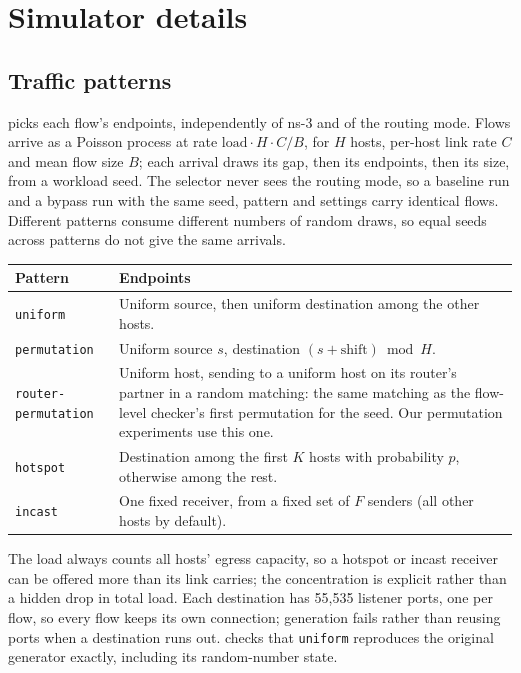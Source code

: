 \section{Simulator details}
\label{app:simulator}

\subsection{Traffic patterns}

 picks each flow's endpoints, independently of ns-3 and of the routing mode. Flows arrive as a Poisson process at rate $\text{load} \cdot H \cdot C / B$, for $H$ hosts, per-host link rate $C$ and mean flow size $B$; each arrival draws its gap, then its endpoints, then its size, from a workload seed. The selector never sees the routing mode, so a baseline run and a bypass run with the same seed, pattern and settings carry identical flows. Different patterns consume different numbers of random draws, so equal seeds across patterns do not give the same arrivals.

\begin{center}
\small
\begin{tabularx}{\linewidth}{@{}l L@{}}
\toprule
Pattern & Endpoints \\
\midrule
\texttt{uniform} & Uniform source, then uniform destination among the other hosts. \\
\texttt{permutation} & Uniform source $s$, destination $(s + \text{shift}) \bmod H$. \\
\texttt{router-permutation} & Uniform host, sending to a uniform host on its router's partner in a random matching: the same matching as the flow-level checker's first permutation for the seed. Our permutation experiments use this one. \\
\texttt{hotspot} & Destination among the first $K$ hosts with probability $p$, otherwise among the rest. \\
\texttt{incast} & One fixed receiver, from a fixed set of $F$ senders (all other hosts by default). \\
\bottomrule
\end{tabularx}
\end{center}

The load always counts all hosts' egress capacity, so a hotspot or incast receiver can be offered more than its link carries; the concentration is explicit rather than a hidden drop in total load. Each destination has 55{,}535 listener ports, one per flow, so every flow keeps its own connection; generation fails rather than reusing ports when a destination runs out.  checks that \texttt{uniform} reproduces the original generator exactly, including its random-number state.

